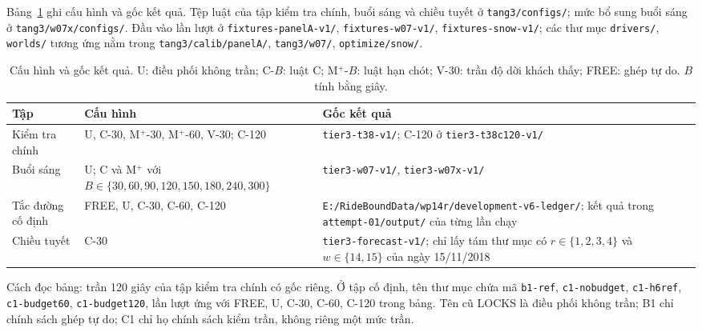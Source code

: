 Bảng~\ref{bang:pl-goc} ghi cấu hình và gốc kết quả. Tệp luật của tập kiểm tra chính, buổi sáng và chiều tuyết ở \nolinkurl{tang3/configs/}; mức bổ sung buổi sáng ở \nolinkurl{tang3/w07x/configs/}. Đầu vào lần lượt ở \nolinkurl{fixtures-panelA-v1/}, \nolinkurl{fixtures-w07-v1/}, \nolinkurl{fixtures-snow-v1/}; các thư mục \nolinkurl{drivers/}, \nolinkurl{worlds/} tương ứng nằm trong \nolinkurl{tang3/calib/panelA/}, \nolinkurl{tang3/w07/}, \nolinkurl{optimize/snow/}.

\begin{table}[htbp]
\centering
\caption{Cấu hình và gốc kết quả. U: điều phối không trần; C-$B$: luật C; M$^+$-$B$: luật hạn chót; V-30: trần độ dời khách thấy; FREE: ghép tự do. $B$ tính bằng giây.}
\label{bang:pl-goc}
\begin{tabular}{@{}p{2.8cm}p{5.2cm}p{6.8cm}@{}}
\toprule
\textbf{Tập} & \textbf{Cấu hình} & \textbf{Gốc kết quả} \\
\midrule
Kiểm tra chính & U, C-30, M$^+$-30, M$^+$-60, V-30; C-120 & \nolinkurl{tier3-t38-v1/}; C-120 ở \nolinkurl{tier3-t38c120-v1/} \\
Buổi sáng & U; C và M$^+$ với $B\in\{30,60,90,120,150,180,240,300\}$ & \nolinkurl{tier3-w07-v1/}, \nolinkurl{tier3-w07x-v1/} \\
Tắc đường cố định & FREE, U, C-30, C-60, C-120 & \nolinkurl{E:/RideBoundData/wp14r/development-v6-ledger/}; kết quả trong \nolinkurl{attempt-01/output/} của từng lần chạy \\
Chiều tuyết & C-30 & \nolinkurl{tier3-forecast-v1/}; chỉ lấy tám thư mục có $r\in\{1,2,3,4\}$ và $w\in\{14,15\}$ của ngày 15/11/2018 \\
\bottomrule
\end{tabular}
\end{table}

Cách đọc bảng: trần 120 giây của tập kiểm tra chính có gốc riêng. Ở tập cố định, tên thư mục chứa mã \nolinkurl{b1-ref}, \nolinkurl{c1-nobudget}, \nolinkurl{c1-h6ref}, \nolinkurl{c1-budget60}, \nolinkurl{c1-budget120}, lần lượt ứng với FREE, U, C-30, C-60, C-120 trong bảng. Tên cũ LOCKS là điều phối không trần; B1 chỉ chính sách ghép tự do; C1 chỉ họ chính sách kiểm trần, không riêng một mức trần.

